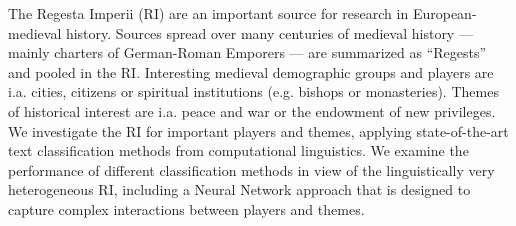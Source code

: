 The Regesta Imperii (RI) are an important source for research in European-medieval history. Sources spread over many centuries of medieval history ---mainly charters of German-Roman Emporers --- are summarized as ``Regests'' and pooled in the RI. Interesting medieval demographic groups and players are i.a. cities, citizens or spiritual institutions (e.g. bishops or monasteries). Themes of historical interest are i.a. peace and war or the endowment of new privileges. We investigate the RI for important players and themes, applying state-of-the-art text classification methods from computational linguistics. We examine the performance of different classification methods in view of the linguistically very heterogeneous RI, including a Neural Network approach that is designed to capture complex interactions between players and themes.

